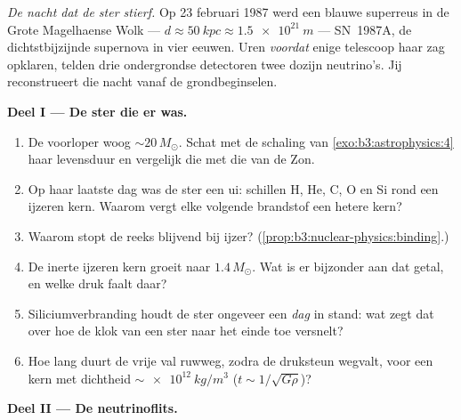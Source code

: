 \begin{problem}\label{pb:b3:astrophysics:1}
\emph{De nacht dat de ster stierf.} Op 23 februari 1987 werd een blauwe
superreus in de Grote Magelhaense Wolk --- $d \approx
\qty{50}{kpc} \approx \qty{1.5e21}{m}$ --- SN~1987A, de
dichtstbijzijnde supernova in vier eeuwen. Uren \emph{voordat} enige
telescoop haar zag opklaren, telden drie ondergrondse detectoren
twee dozijn neutrino's. Jij reconstrueert die nacht vanaf de
grondbeginselen.

\medskip\noindent\textbf{Deel I --- De ster die er was.}

\begin{enumerate}
  \item De voorloper woog ${\sim}20\,M_\odot$. Schat met de
        schaling van \cref{exo:b3:astrophysics:4} haar
        levensduur en vergelijk die met die van de Zon.
  \item Op haar laatste dag was de ster een ui: schillen H, He, C, O en Si
        rond een ijzeren kern. Waarom vergt elke volgende
        brandstof een hetere kern?
  \item Waarom stopt de reeks blijvend bij ijzer?
        (\cref{prop:b3:nuclear-physics:binding}.)
  \item De inerte ijzeren kern groeit naar $1.4\,M_\odot$. Wat is er
        bijzonder aan dat getal, en welke druk faalt
        daar?
  \item Siliciumverbranding houdt de ster ongeveer een \emph{dag}
        in stand: wat zegt dat over hoe de klok van een ster
        naar het einde toe versnelt?
  \item Hoe lang duurt de vrije val ruwweg, zodra de druksteun
        wegvalt, voor een kern met dichtheid
        $\sim\qty{e12}{kg/m^3}$ ($t \sim 1/\sqrt{G\rho}$)?
\end{enumerate}

\medskip\noindent\textbf{Deel II --- De neutrinoflits.}


\end{problem}
